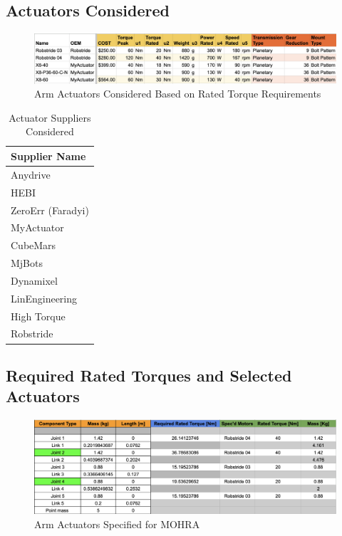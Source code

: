 \documentclass{article}
\begin{document}
\newpage
\subsection{Actuators Considered}

\begin{figure}[H]
    \centering
    \includegraphics[scale=0.5]{assets/Design Presentation/Actuators_arm.png}
    \caption{Arm Actuators Considered Based on Rated Torque Requirements}
    \label{fig:enter-label}
\end{figure}

\begin{table}[h!]
\centering
\renewcommand{\arraystretch}{1.2}
\setlength{\tabcolsep}{10pt} %
\begin{tabular}{|l|}
\hline
\textbf{Supplier Name} \\
\hline
Anydrive \\
HEBI \\
ZeroErr (Faradyi) \\
MyActuator \\
CubeMars \\
MjBots \\
Dynamixel \\
LinEngineering \\
High Torque \\
Robstride \\
\hline
\end{tabular}
\caption{Actuator Suppliers Considered}
\end{table}



\newpage
\subsection{Required Rated Torques and Selected Actuators}
\begin{figure}[H]
    \centering
    \includegraphics[scale=0.5]{assets/Design Presentation/Arm Rated Torque and Specs.png}
    \caption{Arm Actuators Specified for MOHRA}
    \label{fig:enter-label}
\end{figure}
\end{document}
